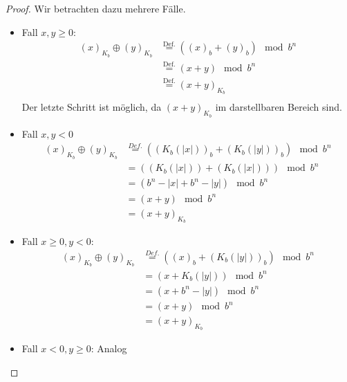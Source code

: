 \begin{proof}
Wir betrachten dazu mehrere Fälle.
\begin{itemize}
	\item Fall $x,y \ge 0$: \\
\begin{align*}
(x)_{K_b} \oplus (y)_{K_b}
    &\overset{\text{Def.}}{=}\left( (x)_b + (y)_b \right) \mod b^{n} \\
    &\overset{\text{Def.}}{=} (x+y) \mod b^{n} \\
    &\overset{\text{Def.}}{=} (x+y)_{K_b} \\
\end{align*}
Der letzte Schritt ist möglich, da $(x+y)_{K_b}$ im darstellbaren Bereich sind.
\item Fall $x,y <0$
\begin{align*}
(x)_{K_b} \oplus (y)_{K_b}
&\overset{Def.}{=} \left( \left( K_b(|x|) \right)_b + \left( K_b(|y|) \right)_b \right) \mod b^{n} \\
&\overset{   }{=}\left( (K_b(|x|)) +\left( K_b\left( |x| \right) \right)\right) \mod b^{n} \\
&= (b^{n}-|x| + b^{n}-|y|) \mod b^{n} \\
&= (x+y) \mod b^{n} \\
&= (x+y)_{K_b}
\end{align*}
\item Fall $x\ge 0, y<0$: \\
\begin{align*}
(x)_{K_b} \oplus (y)_{K_b}
&\overset{Def.}{=} ((x)_b + (K_b(|y|))_b) \mod b^{n} \\
&=(x+K_b(|y|)) \mod b^{n} \\
&=(x+b^{n}-|y|) \mod b^{n} \\
&=(x+y) \mod b^{n} \\
&= (x+y)_{K_b}
\end{align*}
\item Fall $x<0, y\ge 0$: Analog
\end{itemize}
\end{proof}
